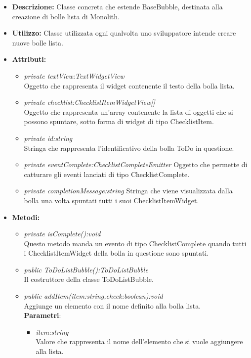 \begin{itemize}
\item \textbf{Descrizione:} Classe concreta che estende BaseBubble, destinata alla creazione di bolle lista di Monolith.
\item \textbf{Utilizzo:} Classe utilizzata ogni qualvolta uno sviluppatore intende creare nuove bolle lista.
\item \textbf{Attributi:}
\begin{itemize}
\item \textit{private textView:TextWidgetView}\\
Oggetto che rappresenta il widget contenente il testo della bolla lista.
\item \textit{private checklist:ChecklistItemWidgetView[]}\\
Oggetto che rappresenta un'array contenente la lista di oggetti che si possono spuntare, sotto forma di widget di tipo ChecklistItem.
\item \textit {private id:string}\\
Stringa che rappresenta l'identificativo della bolla ToDo in questione.
\item \textit {private eventComplete:ChecklistCompleteEmitter}
Oggetto che permette di catturare gli eventi lanciati di tipo ChecklistComplete.
\item \textit {private completionMessage:string}
Stringa che viene visualizzata dalla bolla una volta spuntati tutti i suoi ChecklistItemWidget.
\end{itemize}
\item \textbf{Metodi:}
\begin{itemize}
\item \textit{private isComplete():void}\\
Questo metodo manda un evento di tipo ChecklistComplete quando tutti i ChecklistItemWidget della bolla in questione sono spuntati.
\item \textit{public ToDoListBubble():ToDoListBubble}\\
Il costruttore della classe ToDoListBubble.
\item \textit{public addItem(item:string,check:boolean):void}\\
Aggiunge un elemento con il nome definito alla bolla lista.
\\ \textbf{Parametri}: \begin{itemize}
\item \textit{item:string}\\
Valore che rappresenta il nome dell'elemento che si vuole aggiungere alla lista.

\end{itemize}
\end{itemize}
\end{itemize}
